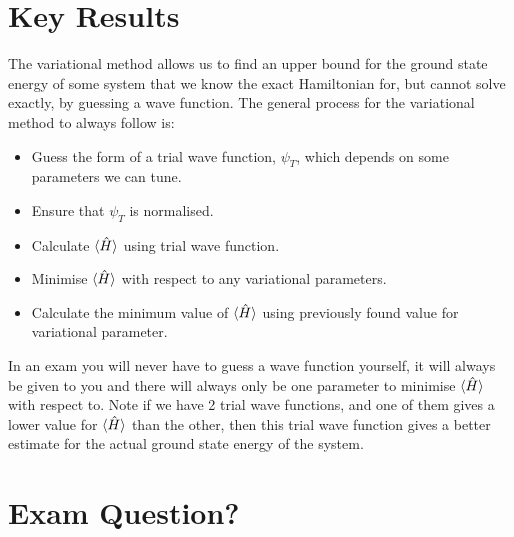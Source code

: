 \section{Key Results}

The variational method allows us to find an upper bound for the ground state energy of some system that we know the exact Hamiltonian for, but cannot solve exactly, by guessing a wave function. The general process for the variational method to always follow is:

\begin{itemize}
    \item Guess the form of a trial wave function, $\psi_T$, which depends on some parameters we can tune.
    \item Ensure that $\psi_T$ is normalised.
    \item Calculate $\braket{\Hat{H}}$ using trial wave function.
    \item Minimise $\braket{\Hat{H}}$ with respect to any variational parameters.
    \item Calculate the minimum value of $\braket{\Hat{H}}$ using previously found value for variational parameter.
\end{itemize}

\noindent In an exam you will never have to guess a wave function yourself, it will always be given to you and there will always only be one parameter to minimise $\braket{\Hat{H}}$ with respect to. Note if we have 2 trial wave functions, and one of them gives a lower value for $\braket{\Hat{H}}$ than the other, then this trial wave function gives a better estimate for the actual ground state energy of the system.

\section{Exam Question?}
